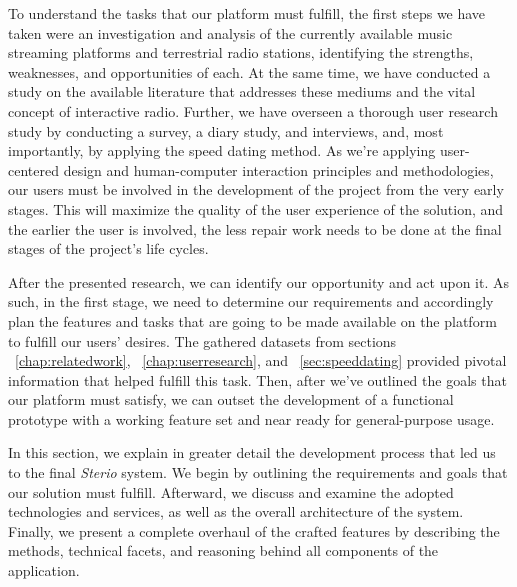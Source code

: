 \cleardoublepage
\label{chap:steriosystem}

To understand the tasks that our platform must fulfill, the first steps we have taken were an investigation and analysis of the currently available music streaming platforms and terrestrial radio stations, identifying the strengths, weaknesses, and opportunities of each. At the same time, we have conducted a study on the available literature that addresses these mediums and the vital concept of interactive radio. Further, we have overseen a thorough user research study by conducting a survey, a diary study, and interviews, and, most importantly, by applying the speed dating method. As we're applying user-centered design and human-computer interaction principles and methodologies, our users must be involved in the development of the project from the very early stages. This will maximize the quality of the user experience of the solution, and the earlier the user is involved, the less repair work needs to be done at the final stages of the project's life cycles.~\cite{Courage2005}

After the presented research, we can identify our opportunity and act upon it. As such, in the first stage, we need to determine our requirements and accordingly plan the features and tasks that are going to be made available on the platform to fulfill our users' desires. The gathered datasets from sections ~\ref{chap:relatedwork}, ~\ref{chap:userresearch}, and ~\ref{sec:speeddating} provided pivotal information that helped fulfill this task. Then, after we've outlined the goals that our platform must satisfy, we can outset the development of a functional prototype with a working feature set and near ready for general-purpose usage.

In this section, we explain in greater detail the development process that led us to the final \textit{Sterio} system. We begin by outlining the requirements and goals that our solution must fulfill. Afterward, we discuss and examine the adopted technologies and services, as well as the overall architecture of the system. Finally, we present a complete overhaul of the crafted features by describing the methods, technical facets, and reasoning behind all components of the application.


